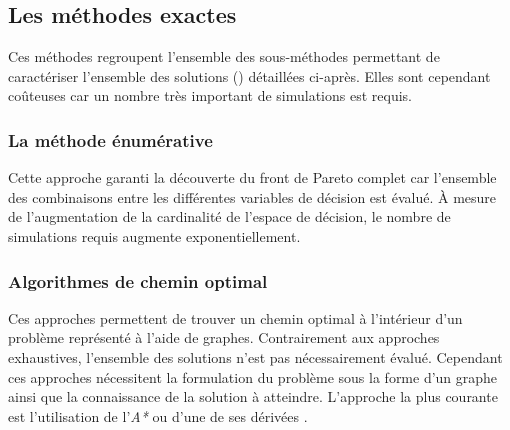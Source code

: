 \subsection{Les méthodes exactes} %
\label{sub:les_methodes_exactes}
Ces méthodes regroupent l’ensemble des sous-méthodes permettant de caractériser l’ensemble
des solutions () détaillées ci-après. Elles sont cependant
coûteuses car un nombre très important de simulations est requis.


\subsubsection{La méthode énumérative} %
\label{ssub:la_methode_enumerative}
Cette approche garanti la découverte du front de Pareto complet car l’ensemble des
combinaisons entre les différentes variables de décision est évalué. À mesure de
l’augmentation de la cardinalité de l’espace de décision, le nombre de simulations requis
augmente exponentiellement.


\subsubsection{Algorithmes de chemin optimal} %
\label{ssub:algorithmes_de_chemin_optimal}
Ces approches permettent de trouver un chemin optimal à l’intérieur d’un problème
représenté à l’aide de graphes. Contrairement aux approches exhaustives, l’ensemble des
solutions n’est pas nécessairement évalué. Cependant ces approches nécessitent la
formulation du problème sous la forme d’un graphe ainsi que la connaissance de la solution
à atteindre. L’approche la plus courante est l’utilisation de l’\textit{A*} ou d’une de
ses dérivées \parencite{Hart1968100}.


